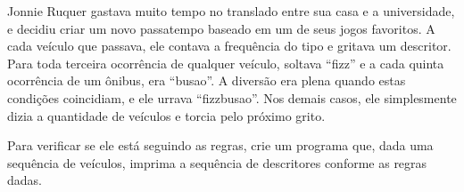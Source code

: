 Jonnie Ruquer gastava muito tempo no translado entre sua casa e a universidade, e decidiu criar um novo passatempo baseado em um de seus jogos favoritos. A cada veículo que passava, ele contava a frequência do tipo e gritava um descritor. Para toda terceira ocorrência de qualquer veículo, soltava ``fizz'' e a cada quinta ocorrência de um ônibus, era ``busao''. A diversão era plena quando estas condições coincidiam, e ele urrava ``fizzbusao''. Nos demais casos, ele simplesmente dizia a quantidade de veículos e torcia pelo próximo grito. 

Para verificar se ele está seguindo as regras, crie um programa que, dada uma sequência de veículos, imprima a sequência de descritores conforme as regras dadas.
